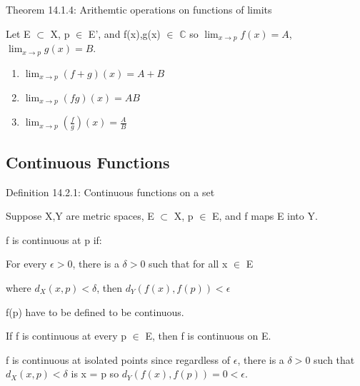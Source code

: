     \vspace{0.5cm}

{ \color{red} Theorem 14.1.4: Arithemtic operations on functions of limits }

    \begin{adjustbox}{minipage=14cm, right, vspace=0.1cm 0cm}
        Let E $\subset$ X, p $\in$ E', and f(x),g(x) $\in$ $\mathbb{C}$ so 
        $\lim_{x \rightarrow p} f(x) = A$, $\lim_{x \rightarrow p} g(x) = B$.
    \end{adjustbox}

    \vspace{0.2cm}

    \begin{enumerate}[label=(\alph*), leftmargin=2cm, itemsep=0.1cm]
        \item $\lim_{x \rightarrow p} (f+g)(x) = A+B$
        \item $\lim_{x \rightarrow p} (fg)(x) = AB$
        \item $\lim_{x \rightarrow p} (\frac{f}{g})(x) = \frac{A}{B}$
    \end{enumerate}

\newpage





\subsection{ Continuous Functions }

{ \color{blue} Definition 14.2.1: Continuous functions on a set }

    \begin{adjustbox}{minipage=14cm, right, vspace=0.1cm 0cm}
        Suppose X,Y are metric spaces, E $\subset$ X, p $\in$ E, and
        f maps E into Y.

        f is continuous at p if:
        
        \begin{adjustbox}{minipage=13cm, right, vspace=0.1cm 0cm}
            For every $\epsilon > 0$, there is a
            $\delta > 0$ such that
            for all x $\in$ E
            
            where $d_X(x,p) < \delta$, then
            $d_Y(f(x),f(p)) < \epsilon$
        \end{adjustbox}

        f(p) have to be defined to be continuous.

        If f is continuous at every p $\in$ E, then f is continuous on E.

        f is continuous at isolated points since regardless of $\epsilon$,
        there is a $\delta > 0$ such that $d_X(x,p) < \delta$ is x = p so
        $d_Y(f(x),f(p)) = 0 < \epsilon$.
    \end{adjustbox}

